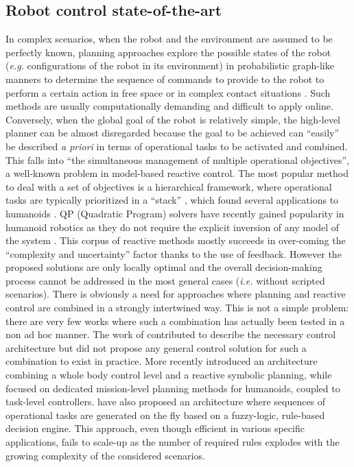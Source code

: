 \documentclass[final,5p,twocolumn]{elsarticle}
\begin{document}
\subsection{Robot control state-of-the-art}
In complex scenarios, when the robot and the environment are assumed to be perfectly known, planning approaches explore the possible states of the robot (\textit{e.g.} configurations of the robot in its environment) in probabilistic graph-like manners \cite{LaValle2006} to determine the sequence of commands to provide to the robot to perform a certain action in free space \cite{Dalibard2009} \cite{Kuffner2001} or in complex contact situations \cite{Bouyarmane2009} \cite{Bouyarmane2011}. Such methods are usually computationally demanding and difficult to apply online. Conversely, when the global goal of the robot is relatively simple, the high-level planner can be almost disregarded because the goal to be achieved can ``easily'' be described \textit{a priori} in terms of operational tasks \cite{Khatib1986} to be activated and combined. This falls into ``the simultaneous management of multiple operational objectives'', a well-known problem in model-based reactive control. The most popular method to deal with a set of objectives is a hierarchical framework, where operational tasks are typically prioritized in a ``stack'' \cite{Mansard2007}, which found several applications to humanoids \cite{Sentis2010} \cite{Mistry2011}. QP (Quadratic Program) solvers have recently gained popularity in humanoid robotics as they do not require the explicit inversion of any model of the system \cite{abe2007} \cite{colette2008} \cite{Escande2010} \cite{Salini2011}. This corpus of reactive methods mostly succeeds in over-coming the ``complexity and uncertainty'' factor thanks to the use of feedback. However the proposed solutions are only locally optimal and the overall decision-making process cannot be addressed in the most general cases (\textit{i.e.} without scripted scenarios). There is obviously a need for approaches where planning and reactive control are combined in a strongly intertwined way. This is not a simple problem: there are very few works where such a combination has actually been tested in a non ad hoc manner. The work of \cite{Alami1997} contributed to describe the necessary control architecture but did not propose any general control solution for such a combination to exist in practice. More recently \cite{PhilippsenRolandandNejatiNeginandSentis2009} introduced an architecture combining a whole body control level and a reactive symbolic planning, while \cite{yoshida2005} focused on dedicated mission-level planning methods for humanoids, coupled to task-level controllers. \cite{Salini2011} \cite{salini2011b} have also proposed an architecture where sequences of operational tasks are generated on the fly based on a fuzzy-logic, rule-based decision engine. This approach, even though efficient in various specific applications, fails to scale-up as the number of required rules explodes with the growing complexity of the considered scenarios.
\end{document}
